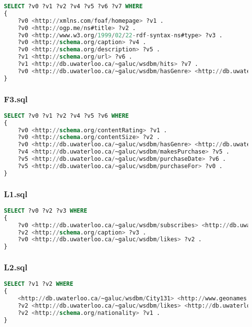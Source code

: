 \documentclass[titlepage, a4paper, 12pt] {article}
\begin{document}
\begin{lstlisting}[language=SQL] 
SELECT ?v0 ?v1 ?v2 ?v4 ?v5 ?v6 ?v7 WHERE 
{
	?v0 <http://xmlns.com/foaf/homepage> ?v1 .
	?v0 <http://ogp.me/ns#title> ?v2 .
	?v0 <http://www.w3.org/1999/02/22-rdf-syntax-ns#type> ?v3 .
	?v0 <http://schema.org/caption> ?v4 .
	?v0 <http://schema.org/description> ?v5 .
	?v1 <http://schema.org/url> ?v6 .
	?v1 <http://db.uwaterloo.ca/~galuc/wsdbm/hits> ?v7 .
	?v0 <http://db.uwaterloo.ca/~galuc/wsdbm/hasGenre> <http://db.uwaterloo.ca/~galuc/wsdbm/SubGenre35> .
}
\end{lstlisting}

\subsubsection{F3.sql}

\begin{lstlisting}[language=SQL] 
SELECT ?v0 ?v1 ?v2 ?v4 ?v5 ?v6 WHERE 
{
	?v0 <http://schema.org/contentRating> ?v1 .
	?v0 <http://schema.org/contentSize> ?v2 .
	?v0 <http://db.uwaterloo.ca/~galuc/wsdbm/hasGenre> <http://db.uwaterloo.ca/~galuc/wsdbm/SubGenre59> .
	?v4 <http://db.uwaterloo.ca/~galuc/wsdbm/makesPurchase> ?v5 .
	?v5 <http://db.uwaterloo.ca/~galuc/wsdbm/purchaseDate> ?v6 .
	?v5 <http://db.uwaterloo.ca/~galuc/wsdbm/purchaseFor> ?v0 .
}
\end{lstlisting}

\subsubsection{L1.sql}

\begin{lstlisting}[language=SQL] 
SELECT ?v0 ?v2 ?v3 WHERE 
{
	?v0 <http://db.uwaterloo.ca/~galuc/wsdbm/subscribes> <http://db.uwaterloo.ca/~galuc/wsdbm/Website38303> .
	?v2 <http://schema.org/caption> ?v3 .
	?v0 <http://db.uwaterloo.ca/~galuc/wsdbm/likes> ?v2 .
}
\end{lstlisting}

\subsubsection{L2.sql}

\begin{lstlisting}[language=SQL] 
SELECT ?v1 ?v2 WHERE 
{
	<http://db.uwaterloo.ca/~galuc/wsdbm/City131> <http://www.geonames.org/ontology#parentCountry> ?v1 .
	?v2 <http://db.uwaterloo.ca/~galuc/wsdbm/likes> <http://db.uwaterloo.ca/~galuc/wsdbm/Product0> .
	?v2 <http://schema.org/nationality> ?v1 .
}
\end{lstlisting}
\end{document}
